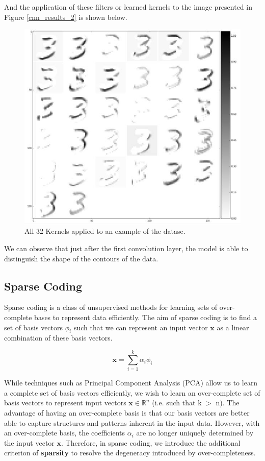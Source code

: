 \documentclass[	DIV=calc,%
				paper=a4,%
				fontsize=11pt,%
				twocolumn]{scrartcl}	 %
\begin{document}
And the application of these filters or learned kernels to the image presented in Figure \ref{cnn_results_2} is shown below. 

\begin{figure}[H]
    \centering
    \includegraphics[width=0.8\linewidth]{data/cnn_results_4.png}
    \caption{All 32 Kernels applied to an example of the datase.}
    \label{cnn_results_4.png}
\end{figure}

We can observe that just after the first convolution layer, the model is able to distinguish the shape of the contours of the data. 

\subsection*{Sparse Coding}
Sparse coding is a class of unsupervised methods for learning sets of over-complete bases to represent data efficiently. The aim of sparse coding is to find a set of basis vectors $\phi_{i}$ such that we can represent an input vector $\mathbf{x}$ as a linear combination of these basis vectors. \cite{ufldl_sparse_coding}

$$ \mathbf{x} = \sum_{i=1}^{k} \alpha_{i}\phi_{i} $$

While techniques such as Principal Component Analysis (PCA) allow us to learn a complete set of basis vectors efficiently, we wish to learn an over-complete set of basis vectors to represent input vectors $\mathbf{x}\in\mathbb{R}^n$ (i.e. such that k $>$ n). The advantage of having an over-complete basis is that our basis vectors are better able to capture structures and patterns inherent in the input data. However, with an over-complete basis, the coefficients $\alpha_{i}$ are no longer uniquely determined by the input vector $\mathbf{x}$. Therefore, in sparse coding, we introduce the additional criterion of \textbf{sparsity} to resolve the degeneracy introduced by over-completeness.
\end{document}
